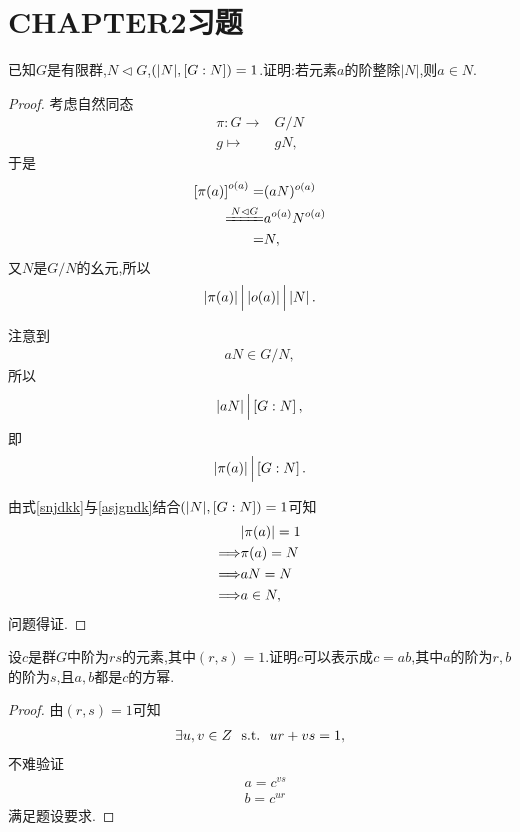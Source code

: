 \section{CHAPTER2习题}
\begin{problem}[P97T1]
    已知$G$是有限群,$N\lhd G$,$\left(|N|,[G:N]\right)=1$.证明:若元素$a$的阶整除$|N|$,则$a\in N$.
\end{problem}
\begin{proof}
    考虑自然同态\begin{align*}
        \pi:G\to&G/N\\
        g\mapsto&gN,
    \end{align*}于是\begin{align*}
        \l[\pi(a)\r]^{o(a)}=&(aN)^{o(a)}\\
        \xlongequal[]{N\lhd G}&a^{o(a)}N^{o(a)}\\
        =&N,
    \end{align*}又$N$是$G/N$的幺元,所以\begin{align}\label{snjdkk}
        \left|\pi(a)\right|\Big|\left|o(a)\right|\Big|\left|N\right|.
    \end{align}

    注意到\begin{align*}
        aN\in G/N,
    \end{align*}所以\begin{align*}
        \left|aN\right|\Big|\left[G:N\right],
    \end{align*}即\begin{align}\label{asjgndk}
        \left|\pi(a)\right|\Big|\left[G:N\right].
    \end{align}

    由式\eqref{snjdkk}与\eqref{asjgndk}结合$\left(|N|,[G:N]\right)=1$可知\begin{align*}
        &|\pi(a)|=1\\
        \Longrightarrow&\pi(a)=N\\
        \Longrightarrow&aN=N\\
        \Longrightarrow&a\in N,
    \end{align*}问题得证.
\end{proof}
\begin{problem}[P97T2]
    设$c$是群$G$中阶为$rs$的元素,其中$(r,s)=1$.证明$c$可以表示成$c=ab$,其中$a$的阶为$r,b$的阶为$s$,且$a,b$都是$c$的方幂.
\end{problem}
\begin{proof}
    由$(r,s)=1$可知\begin{align*}
        \exists u,v\in\relax{Z}\ \ \mathrm{s.t.}\ \  ur+vs=1,
    \end{align*}不难验证\begin{align*}
        &a=c^{vs}\\
        &b=c^{ur}
    \end{align*}满足题设要求.
\end{proof}
